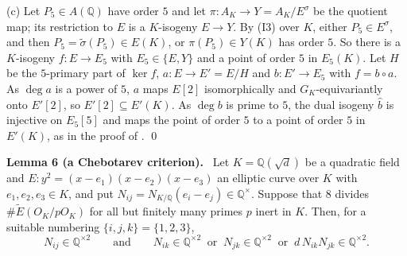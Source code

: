 \documentclass[11pt]{article}
\newenvironment{statement}[1]{\par\medskip\noindent\phantomsection\textbf{#1}\ }{\par\medskip}
\newcommand{\Q}{\mathbb Q}
\begin{document}
(c) Let \(P_5\in A(\Q)\) have order \(5\) and let \(\pi:A_K\to Y=A_K/E^\sigma\) be the quotient
map; its restriction to \(E\) is a \(K\)-isogeny \(E\to Y\). By (I3) over \(K\), either
\(P_5\in E^\sigma\), and then \(P_5=\tilde\sigma(P_5)\in E(K)\), or \(\pi(P_5)\in Y(K)\) has order
\(5\). So there is a \(K\)-isogeny \(f:E\to E_5\) with \(E_5\in\{E,Y\}\) and a point of order \(5\)
in \(E_5(K)\). Let \(H\) be the \(5\)-primary part of \(\ker f\), \(a:E\to E'=E/H\) and \(b:E'\to
E_5\) with \(f=b\circ a\). As \(\deg a\) is a power of \(5\), \(a\) maps \(E[2]\) isomorphically
and \(G_K\)-equivariantly onto \(E'[2]\), so \(E'[2]\subseteq E'(K)\). As \(\deg b\) is prime to
\(5\), the dual isogeny \(\hat b\) is injective on \(E_5[5]\) and maps the point of order \(5\)
to a point of order \(5\) in \(E'(K)\), as in the proof of \cite[Lemma~1]{P63}. \qed

\begin{statement}{Lemma 6 (a Chebotarev criterion).}\label{lemma-cheb}
Let \(K=\Q(\sqrt d)\) be a quadratic field and \(E:y^2=(x-e_1)(x-e_2)(x-e_3)\) an elliptic curve
over \(K\) with \(e_1,e_2,e_3\in K\), and put \(N_{ij}=N_{K/\Q}(e_i-e_j)\in\Q^\times\). Suppose
that \(8\) divides \(\#\widetilde E(O_K/pO_K)\) for all but finitely many primes \(p\) inert in
\(K\). Then, for a suitable numbering \(\{i,j,k\}=\{1,2,3\}\),
\[N_{ij}\in\Q^{\times2}\qquad\text{and}\qquad N_{ik}\in\Q^{\times2}\ \text{ or }\ N_{jk}\in\Q^{\times2}
\ \text{ or }\ d\,N_{ik}N_{jk}\in\Q^{\times2}.\]
\end{statement}
\end{document}
